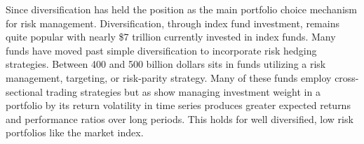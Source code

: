 \noindent %
Since \citet{markowitz_portfolio_1952} diversification has held the position as the main portfolio choice mechanism for risk management. Diversification, through index fund investment, remains quite popular with nearly \$7 trillion currently invested in index funds. \citet{ici_factbook} Many funds have moved past simple diversification to incorporate risk hedging strategies. Between 400 and 500 billion dollars sits in funds utilizing a risk management, targeting, or risk-parity strategy. \citep{cao_risk_2016,verma_volatility-targeting_2018} Many of these funds employ cross-sectional trading strategies but as \citet{moreira_volatility-managed_2017} show%
managing investment weight in a portfolio by its return volatility in time series produces greater expected returns and performance ratios over long periods. This holds for well diversified, low risk portfolios like the market index. 
